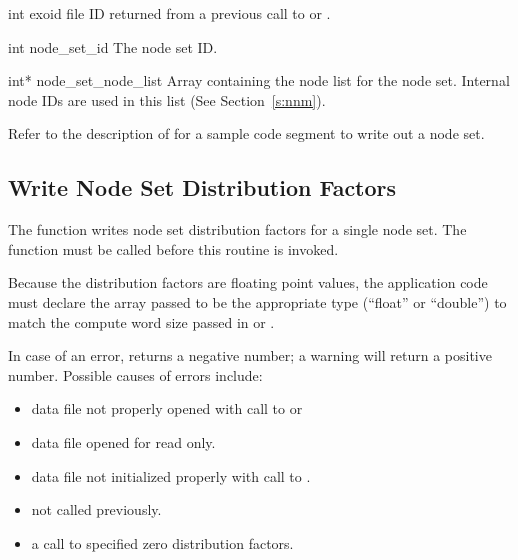 
\begin{parameters}
\item[{int exoid \R{}}]
\exo{} file ID returned from a previous call to 
or .

\item[{int node_set_id \R{}}]
The node set ID.

\item[{int* node_set_node_list \R{}}]
Array containing the node list for the node set. Internal node IDs are
used in this list (See Section~\ref{s:nnm}).
\end{parameters}

Refer to the description of  for a
sample code segment to write out a node set.



\subsection{Write Node Set Distribution Factors}

The function  writes node set
distribution factors for a single node set. The function
 must be called before this routine
is invoked.


Because the distribution factors are floating point values, the
application code must declare the array passed to be the appropriate
type (``float'' or ``double'') to match the compute word size passed
in  or .


In case of an error,  returns a
negative number; a warning will return a positive number.  Possible
causes of errors include:

\begin{itemize}
 \item data file not properly opened with call to 
 or 

 \item data file opened for read only.

 \item data file not initialized properly with call to .

 \item {} not called previously.

 \item a call to  specified zero
 distribution factors.
\end{itemize}

